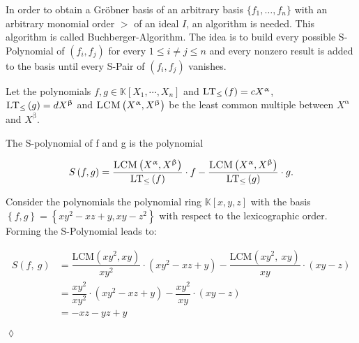 In order to obtain a Gröbner basis of an arbitrary basis $\{f_{1}, \ldots , f_{n}\}$ with an arbitrary monomial order $>$ of an ideal $I$, an algorithm is needed. This algorithm is called Buchberger-Algorithm. The idea is to build every possible S-Polynomial of $\left( f_{i},f_{j}\right) $ for every $ 1 \leq i \neq j \leq n $ and every nonzero result is added to the basis until every S-Pair of $\left( f_{i},f_{j}\right) $ vanishes.

Let the polynomials $f,g \in \mathbb{K}\left[X_{1}, \cdots, X_{n}\right] $ and $\textsc{LT}_{\leq}\left(f \right) = cX^{\upalpha} $, \\  $\textsc{LT}_{\leq}\left(g \right) = dX^{\upbeta} $ and $\textsc{LCM}\left( X^{\upalpha},X^{\upbeta}\right) $ be the least common multiple between $X^{\upalpha}$ and $X^{\upbeta}$. 

\begin{env_definition}[S-Polynomial]
\cite{KHZ} The S-polynomial of f and g is the polynomial

\[ S\left( f,g\right) = \frac{\textsc{LCM}\left( X^{\upalpha}, X^{\upbeta}\right) }{\textsc{LT}_{\leq}\left( f\right) } \cdot f - \frac{ \textsc{LCM}\left( X^{\upalpha}, X^{\upbeta}\right) }{\textsc{LT}_{\leq}\left( g\right) } 
\cdot g. \]


\end{env_definition}

\newpage

\begin{env_example}\normalfont
Consider the polynomials the polynomial ring $\mathbb{K}\left[ x,y,z\right] $ with
the basis $\left\lbrace f,g\right\rbrace = \left\lbrace xy^{2}-xz+y,xy-z^{2} \right\rbrace $ with respect to the lexicographic order.\\
Forming the S-Polynomial leads to:

\begin{align*}
 S \left(f,~g\right) &= \dfrac{\textrm{LCM}\left( xy^{2}, xy \right) } {xy^{2} } \cdot \left(  xy^{2}-xz+y\right) - \dfrac{\textrm{LCM}\left( xy^{2},~xy \right) } {xy } \cdot \left( xy-z \right) \\ 
 &= \dfrac{xy^{2}}{xy^{2}} \cdot \left( xy^{2}-xz+y\right) - \dfrac{xy^{2}}{xy} \cdot \left( xy-z\right) \\
 &= -xz-yz+y 
\end{align*}


\begin{flushright}
$\lozenge$
\end{flushright} 
\end{env_example}

